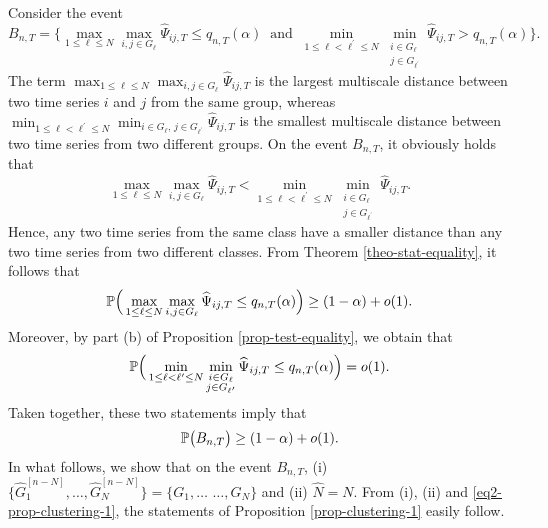 Consider the event  
\[ B_{n,T} = \Big\{ \max_{1 \le \ell \le N} \max_{i,j \in G_\ell} \widehat{\Psi}_{ij,T} \le q_{n,T}(\alpha) \ \text{ and } \ \min_{1 \le \ell < \ell^\prime \le N} \min_{\substack{i \in G_\ell \\ j \in G_{\ell^\prime}}} \widehat{\Psi}_{ij,T} > q_{n,T}(\alpha) \Big\}. \]
The term $\max_{1 \le \ell \le N} \max_{i,j \in G_\ell} \widehat{\Psi}_{ij,T}$ is the largest multiscale distance between two time series $i$ and $j$ from the same group, whereas $\min_{1 \le \ell < \ell^\prime \le N} \min_{i \in G_\ell, \, j \in G_{\ell^\prime}} \widehat{\Psi}_{ij,T}$ is the smallest multiscale distance between two time series from two different groups. On the event $B_{n,T}$, it obviously holds that 
\begin{equation}\label{eq1-prop-clustering-1}
\max_{1 \le \ell \le N} \max_{i,j \in G_\ell} \widehat{\Psi}_{ij,T} < \min_{1 \le \ell < \ell^\prime \le N} \min_{\substack{i \in G_\ell \\ j \in G_{\ell^\prime}}} \widehat{\Psi}_{ij,T}. 
\end{equation}
Hence, any two time series from the same class have a smaller distance than any two time series from two different classes. From Theorem \ref{theo-stat-equality}, it follows that 
\[  \mathbb{P} \Big( \max_{1 \le \ell \le N} \max_{i,j \in G_\ell} \widehat{\Psi}_{ij,T} \le q_{n,T}(\alpha) \Big) \ge (1 - \alpha) + o(1). \]
Moreover, by part (b) of Proposition \ref{prop-test-equality}, we obtain that 
\[  \mathbb{P} \Big( \min_{1 \le \ell < \ell^\prime \le N} \min_{\substack{i \in G_\ell \\ j \in G_{\ell^\prime}}} \widehat{\Psi}_{ij,T} \le q_{n,T}(\alpha) \Big) = o(1). \]
Taken together, these two statements imply that 
\begin{equation}\label{eq2-prop-clustering-1}
\mathbb{P} \big( B_{n,T} \big) \ge (1-\alpha) + o(1). 
\end{equation}
In what follows, we show that on the event $B_{n,T}$, (i) $\{ \widehat{G}_1^{[n-N]},\ldots,\widehat{G}_N^{[n-N]} \big\} = \big\{ G_1,\ldots$ $\ldots,G_N \}$ and (ii) $\widehat{N} = N$. From (i), (ii) and \eqref{eq2-prop-clustering-1}, the statements of Proposition \ref{prop-clustering-1} easily follow. 


